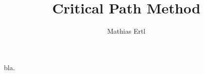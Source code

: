 \documentclass[12pt,a4paper,titlepage]{article}
\author{Mathias Ertl} %
\title{Critical Path Method}
\begin{document}
bla.
\end{document}
